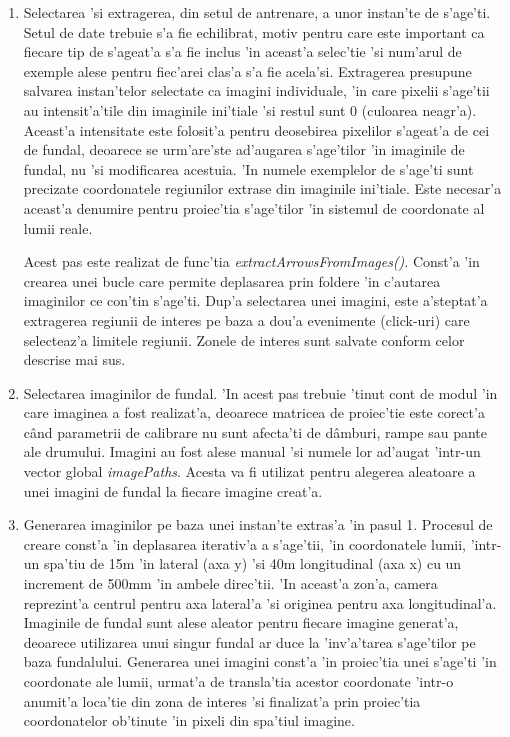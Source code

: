 \documentclass[12pt,a4paper,twoside]{report}
\begin{document}
\begin{enumerate}
\item Selectarea 'si extragerea, din setul de antrenare, a unor instan'te de s'age'ti. Setul de date trebuie s'a fie echilibrat, motiv pentru care este important ca fiecare tip de s'ageat'a s'a fie inclus 'in aceast'a selec'tie 'si num'arul de exemple alese pentru fiec'arei clas'a s'a fie acela'si. Extragerea presupune salvarea instan'telor selectate ca imagini individuale, 'in care pixelii s'age'tii au intensit'a'tile din imaginile ini'tiale 'si restul sunt 0 (culoarea neagr'a). Aceast'a intensitate este folosit'a pentru deosebirea pixelilor s'ageat'a de cei de fundal, deoarece se urm'are'ste ad'augarea s'age'tilor 'in imaginile de fundal, nu 'si modificarea acestuia. 'In numele exemplelor de s'age'ti sunt precizate coordonatele regiunilor extrase din imaginile ini'tiale. Este necesar'a aceast'a denumire pentru proiec'tia s'age'tilor 'in sistemul de coordonate al lumii reale.

Acest pas este realizat de func'tia \textit{extractArrowsFromImages()}. Const'a 'in crearea unei bucle care permite deplasarea prin foldere 'in c'autarea imaginilor ce con'tin s'age'ti. Dup'a selectarea unei imagini, este a'steptat'a extragerea regiunii de interes pe baza a dou'a evenimente (click-uri) care selecteaz'a limitele regiunii. Zonele de interes sunt salvate conform celor descrise mai sus.

\item Selectarea imaginilor de fundal. 'In acest pas trebuie 'tinut cont de modul 'in care imaginea a fost realizat'a, deoarece matricea de proiec'tie este corect'a c\^and parametrii de calibrare nu sunt afecta'ti de d\^amburi, rampe sau pante ale drumului. Imagini au fost alese manual 'si numele lor ad'augat 'intr-un vector global \textit{imagePaths}. Acesta va fi utilizat pentru alegerea aleatoare a unei imagini de fundal la fiecare imagine creat'a.

\item Generarea imaginilor pe baza unei instan'te extras'a 'in pasul 1. Procesul de creare const'a 'in deplasarea iterativ'a a s'age'tii, 'in coordonatele lumii, 'intr-un spa'tiu de 15m 'in lateral (axa y) 'si 40m longitudinal (axa x) cu un increment de 500mm 'in ambele direc'tii. 'In aceast'a zon'a, camera reprezint'a centrul pentru axa lateral'a 'si originea pentru axa longitudinal'a. Imaginile de fundal sunt alese aleator pentru fiecare imagine generat'a, deoarece utilizarea unui singur fundal ar duce la 'inv'a'tarea s'age'tilor pe baza fundalului. Generarea unei imagini const'a 'in proiec'tia unei s'age'ti 'in coordonate ale lumii, urmat'a de transla'tia acestor coordonate 'intr-o anumit'a loca'tie din zona de interes 'si finalizat'a prin proiec'tia coordonatelor ob'tinute 'in pixeli din spa'tiul imagine.


\end{enumerate}
\end{document}
